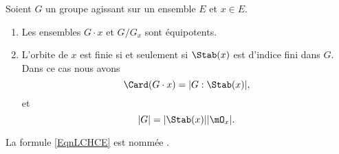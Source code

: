 \begin{proposition}      \label{Propszymlr}
	Soient \( G\) un groupe agissant sur un ensemble \( E\) et \( x\in E\).
	\begin{enumerate}
		\item
		      Les ensembles \( G \cdot x\) et \( G/G_x\) sont équipotents.
		\item       \label{ITEMooCWUGooCOFHYk}
		      L'orbite de \(x\) est finie si et seulement si \( \Stab(x)\) est d'indice fini dans \( G\). Dans ce cas nous avons
		      \begin{equation}        \label{EqnLCHCE}
			      \Card(G\cdot x)=| G:\Stab(x) |,
		      \end{equation}
		      et
		      \begin{equation}        \label{EqCewSXT}
			      | G |=| \Stab(x) | |\mO_x |.
		      \end{equation}
	\end{enumerate}
	La formule \eqref{EqnLCHCE}  est nommée \cite{BIBooGVEDooJXFGuc}.
\end{proposition}

